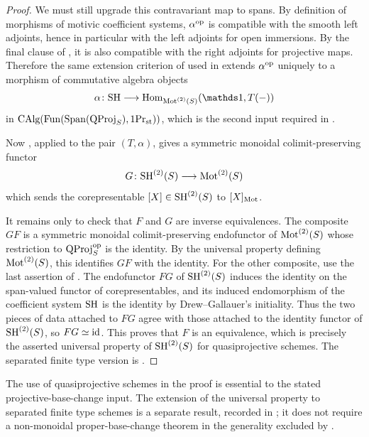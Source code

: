 \documentclass[11pt]{book}
\begin{document}
\begin{proof}
		We must still upgrade this contravariant map to spans. By definition of morphisms of motivic coefficient systems, $\alpha^{\operatorname{op}}$ is compatible with the smooth left adjoints, hence in particular with the left adjoints for open immersions. By the final clause of , it is also compatible with the right adjoints for projective maps. Therefore the same extension criterion of \citet{CLL_Span2} used in  extends $\alpha^{\operatorname{op}}$ uniquely to a morphism of commutative algebra objects
		\[
			\alpha\colon\SH\longrightarrow\Hom_{\Mot^{(2)}(S)}(\unit,T(-))
		\]
		in ${\textup{CAlg}}(\operatorname{Fun}(\operatorname{Span}(\operatorname{QProj}_S),1\textup{Pr}_{\operatorname{st}}))$, which is the second input required in .

		Now , applied to the pair $(T,\alpha)$, gives a symmetric monoidal colimit-preserving functor
		\[
			G\colon\mathrm{SH}^{(2)}(S)\longrightarrow\operatorname{Mot}^{(2)}(S)
		\]
		which sends the corepresentable $[X]\in\mathrm{SH}^{(2)}(S)$ to $[X]_{\operatorname{Mot}}$.

		It remains only to check that $F$ and $G$ are inverse equivalences. The composite $G F$ is a symmetric monoidal colimit-preserving endofunctor of $\operatorname{Mot}^{(2)}(S)$ whose restriction to $\operatorname{QProj}_S^{\textup{op}}$ is the identity. By the universal property defining $\operatorname{Mot}^{(2)}(S)$, this identifies $G F$ with the identity. For the other composite, use the last assertion of . The endofunctor $F G$ of $\mathrm{SH}^{(2)}(S)$ induces the identity on the span-valued functor of corepresentables, and its induced endomorphism of the coefficient system $\mathrm{SH}$ is the identity by Drew--Gallauer's initiality. Thus the two pieces of data attached to $F G$ agree with those attached to the identity functor of $\mathrm{SH}^{(2)}(S)$, so $F G\simeq\operatorname{id}$. This proves that $F$ is an equivalence, which is precisely the asserted universal property of $\mathrm{SH}^{(2)}(S)$ for quasiprojective schemes. The separated finite type version is \citet[Remark~1.3]{Aoki_PhD_Thesis}.
	\end{proof}

	\begin{remark}
		The use of quasiprojective schemes in the proof is essential to the stated projective-base-change input. The extension of the universal property to separated finite type schemes is a separate result, recorded in \citet[Remark~1.3]{Aoki_PhD_Thesis}; it does not require a non-monoidal proper-base-change theorem in the generality excluded by .
	\end{remark}
\end{document}
